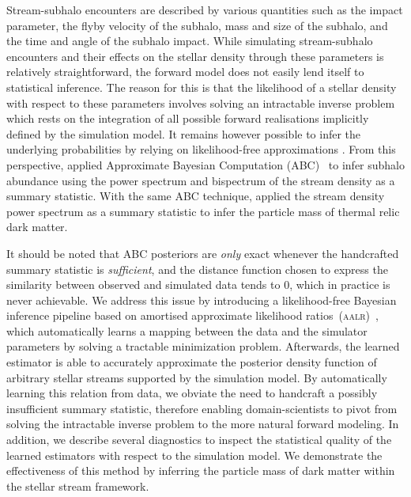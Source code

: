 \documentclass[fleqn,usenatbib]{mnras}
\begin{document}
Stream-subhalo encounters are described by various quantities such as the impact parameter,
the flyby velocity
of the subhalo, mass and size of the subhalo, and the time and angle of the subhalo impact.
While simulating stream-subhalo encounters and their effects on the stellar density through these parameters is relatively straightforward,
the forward model does not easily lend itself to statistical inference.
The reason for this is that the likelihood of a stellar density with respect to these parameters involves solving an
intractable inverse problem which rests on the integration
of all possible forward realisations 
implicitly defined by the simulation model.
It remains however possible to infer the underlying probabilities by relying on likelihood-free approximations \citep{cranmer2020frontier}.
From this perspective, \citet{Bovy2016a} applied Approximate Bayesian Computation (ABC)~\citep{rubin1984bayesianly} to infer subhalo abundance using the power spectrum and bispectrum of the stream density as a summary statistic. With the same ABC technique, \citet{banik2018probing,banik2019novel} applied the stream density power spectrum as a summary statistic to infer the particle mass of thermal relic dark matter.

\medskip

It should be noted that ABC posteriors are \emph{only} exact whenever the handcrafted summary statistic is \emph{sufficient}, and the distance function chosen to express the similarity between observed and simulated data tends to 0, which in practice is never achievable.
We address this issue by introducing a likelihood-free Bayesian inference pipeline based on amortised approximate likelihood ratios~(\textsc{aalr})~\citep{2019arXiv190304057H}, which automatically learns a mapping between the data and the simulator parameters by solving a tractable minimization problem. 
Afterwards, the learned estimator is
able to accurately approximate the posterior density function of arbitrary stellar streams supported by the simulation model.
By automatically learning this relation from data, we obviate the need to handcraft a possibly insufficient summary statistic,
therefore enabling domain-scientists to pivot from solving the intractable inverse problem to the more natural forward modeling.
In addition, we describe several diagnostics to inspect the statistical quality of the learned estimators with respect to the simulation model.
We demonstrate the effectiveness of this method by inferring the particle mass of dark matter within the stellar stream framework.
\end{document}
